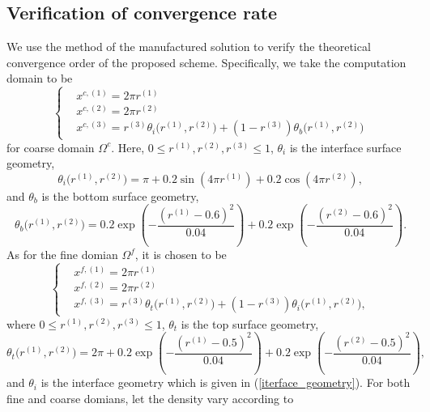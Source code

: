 \subsection{Verification of convergence rate}\label{convergence_study}
We use the method of the manufactured solution to verify the theoretical convergence order of the proposed scheme. Specifically, we take the computation domain to be 
\begin{equation}\label{coarse_domain_manufactured}
\left\{
\begin{aligned}
& x^{c,(1)} = 2\pi r^{(1)}\\
& x^{c,(2)} = 2\pi r^{(2)}\\
& x^{c,(3)} = r^{(3)}\theta_i\big(r^{(1)},r^{(2)}\big) + (1-r^{(3)})\theta_b\big(r^{(1)},r^{(2)}\big)
\end{aligned}
\right.
\end{equation}
for coarse domain $\Omega^c$. Here, $0\leq r^{(1)}, r^{(2)}, r^{(3)}\leq 1$, $\theta_i$ is the interface surface geometry,
\begin{equation}\label{iterface_geometry}
\theta_i\big(r^{(1)},r^{(2)}\big) = \pi+0.2\sin(4\pi r^{(1)})+0.2\cos(4\pi r^{(2)}),
\end{equation}
and 
$\theta_b$ is the bottom surface geometry,
\begin{equation}\label{bottom_geometry}
\theta_b\big(r^{(1)},r^{(2)}\big) = 0.2\exp\left(-\frac{(r^{(1)}-0.6)^2}{0.04}\right)+0.2\exp\left(-\frac{(r^{(2)}-0.6)^2}{0.04}\right).
\end{equation}
As for the fine domian $\Omega^f$, it is chosen to be
\begin{equation}\label{fine_domain_manufactured}
\left\{
\begin{aligned}
& x^{f,(1)} = 2\pi r^{(1)}\\
& x^{f,(2)} = 2\pi r^{(2)}\\
& x^{f,(3)} = r^{(3)}\theta_t\big(r^{(1)},r^{(2)}\big) + (1-r^{(3)})\theta_i\big(r^{(1)},r^{(2)}\big),
\end{aligned}
\right.
\end{equation}
where $0\leq r^{(1)}, r^{(2)}, r^{(3)}\leq 1$, $\theta_t$ is the top surface geometry,
\begin{equation}\label{top_geometry}
\theta_t\big(r^{(1)},r^{(2)}\big) = 2\pi+0.2\exp\left(-\frac{(r^{(1)}-0.5)^2}{0.04}\right)+0.2\exp\left(-\frac{(r^{(2)}-0.5)^2}{0.04}\right),
\end{equation}
and $\theta_i$ is the interface geometry which is given in (\ref{iterface_geometry}). For both fine and coarse domians, let the density vary according to
